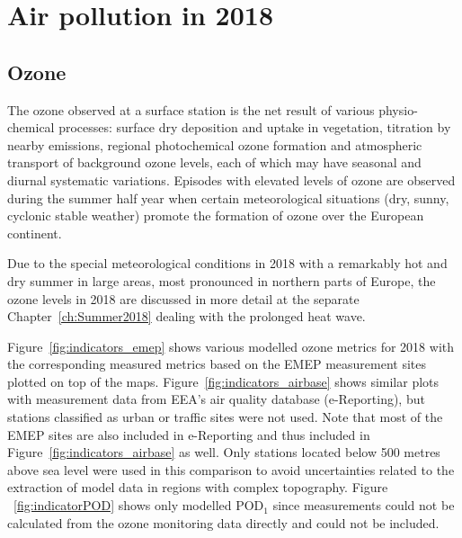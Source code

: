 


\section{Air pollution in 2018} 

\subsection{Ozone}
\label{O3MAX}

The ozone observed at a surface station is the net result of various physio-chemical processes: surface dry deposition and uptake in vegetation, titration by nearby \nox emissions, regional photochemical ozone formation and atmospheric transport of background ozone levels, each of which may have seasonal and diurnal systematic variations. Episodes with elevated levels of ozone are observed during the summer half year when certain meteorological situations (dry, sunny, cyclonic stable weather) promote the formation of ozone over the European continent. 

Due to the special meteorological conditions in 2018 with a remarkably hot and dry summer in large areas, most pronounced in northern parts of Europe, the ozone levels in 2018 are discussed in more detail at the separate Chapter~\ref{ch:Summer2018} dealing with the prolonged heat wave.

Figure~\ref{fig:indicators_emep} shows various modelled ozone metrics for 2018 with the corresponding measured metrics based on the EMEP measurement sites plotted on top of the maps. Figure~\ref{fig:indicators_airbase} shows similar plots with measurement data from EEA's air quality database (e-Reporting), but stations classified as urban or traffic sites were not used. Note that most of the EMEP sites are also included in e-Reporting and thus included in Figure~\ref{fig:indicators_airbase} as well. Only stations located below 500 metres above sea level were used in this comparison to avoid uncertainties related to the extraction of model data in regions with complex topography. Figure
~\ref{fig:indicatorPOD} shows only modelled POD$_1$ since measurements could not be calculated from the ozone monitoring data directly and could not be included.

